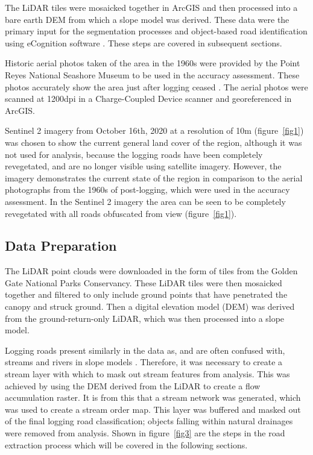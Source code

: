 \documentclass[remotesensing,article,submit,pdftex,moreauthors]{Definitions/mdpi}
\begin{document}
The LiDAR tiles were mosaicked together in ArcGIS \cite{esri} and then processed into a bare earth DEM from which a slope model was derived. These data were the primary input for the segmentation processes and object-based road identification using eCognition software \cite{ecog}. These steps are covered in subsequent sections.

Historic aerial photos taken of the area in the 1960s were provided by the Point Reyes National Seashore Museum to be used in the accuracy assessment. These photos accurately show the area just after logging ceased \cite{becker}. The aerial photos were scanned at 1200dpi in a Charge-Coupled Device scanner and georeferenced in ArcGIS. 

Sentinel 2 imagery from October 16th, 2020 at a resolution of 10m (figure~\ref{fig1}) was chosen to show the current general land cover of the region, although it was not used for analysis, because the logging roads have been completely revegetated, and are no longer visible using satellite imagery. However, the imagery demonstrates the current state of the region in comparison to the aerial photographs from the 1960s of post-logging, which were used in the accuracy assessment. In the Sentinel 2 imagery the area can be seen to be completely revegetated with all roads obfuscated from view (figure~\ref{fig1}). 
\subsection{Data Preparation}

The LiDAR point clouds were downloaded in the form of tiles from the Golden Gate National Parks Conservancy. These LiDAR tiles were then mosaicked together and filtered to only include ground points that have penetrated the canopy and struck ground. Then a digital elevation model (DEM) was derived from the ground-return-only LiDAR, which was then processed into a slope model.

Logging roads present similarly in the data as, and are often confused with, streams and rivers in slope models \cite{sherba}. Therefore, it was necessary to create a stream layer with which to mask out stream features from analysis. This was achieved by using the DEM derived from the LiDAR to create a flow accumulation raster. It is from this that a stream network was generated, which was used to create a stream order map. This layer was buffered and masked out of the final logging road classification; objects falling within natural drainages were removed from analysis. Shown in figure~\ref{fig3} are the steps in the road extraction process which will be covered in the following sections.
\end{document}
